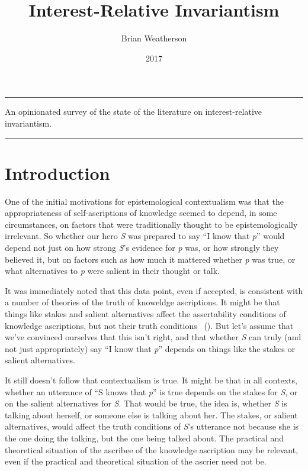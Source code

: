 \documentclass[
  10pt,
  letterpaper,
  DIV=11,
  numbers=noendperiod,
  twoside]{scrartcl}
\title{Interest-Relative Invariantism}
\author{Brian Weatherson}
\date{2017}
\renewenvironment{abstract}
 {\vspace{-1.25cm}
 \quotation\small\noindent\rule{\linewidth}{.5pt}\par\smallskip
 \noindent }
 {\par\noindent\rule{\linewidth}{.5pt}\endquotation}
\begin{document}
\maketitle
\begin{abstract}
An opinionated survey of the state of the literature on
interest-relative invariantism.
\end{abstract}


\section{Introduction}\label{introduction}

One of the initial motivations for epistemological contextualism was
that the appropriateness of self-ascriptions of knowledge seemed to
depend, in some circumstances, on factors that were traditionally
thought to be epistemologically irrelevant. So whether our hero \emph{S}
was prepared to say ``I know that \emph{p}'' would depend not just on
how strong \emph{S}'s evidence for \emph{p} was, or how strongly they
believed it, but on factors such as how much it mattered whether
\emph{p} was true, or what alternatives to \emph{p} were salient in
their thought or talk.

It was immediately noted that this data point, even if accepted, is
consistent with a number of theories of the truth of knoweldge
ascriptions. It might be that things like stakes and salient
alternatives affect the assertability conditions of knowledge
ascriptions, but not their truth conditions
~(). But let's assume that we've
convinced ourselves that this isn't right, and that whether \emph{S} can
truly (and not just appropriately) say ``I know that \emph{p}'' depends
on things like the stakes or salient alternatives.

It still doesn't follow that contextualism is true. It might be that in
all contexts, whether an utterance of ``S knows that \emph{p}'' is true
depends on the stakes for \emph{S}, or on the salient alternatives for
\emph{S}. That would be true, the idea is, whether \emph{S} is talking
about herself, or someone else is talking about her. The stakes, or
salient alternatives, would affect the truth conditions of \emph{S}'s
utterance not because she is the one doing the talking, but the one
being talked about. The practical and theoretical situation of the
ascribee of the knowledge ascription may be relevant, even if the
practical and theoretical situation of the ascrier need not be.
\end{document}
